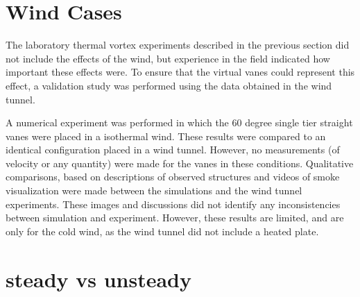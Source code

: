 \section{Wind Cases}

The laboratory thermal vortex experiments described in the previous
section did not include the effects of the wind, but experience in
the field indicated how important these effects were. To ensure that the
virtual vanes could represent this effect, a validation study 
was performed using the data obtained in the wind tunnel.

A numerical experiment was performed in which the 60 degree single tier
straight vanes were placed in a isothermal wind.  These results were
compared to an identical configuration placed in a wind tunnel.
However, no measurements (of velocity or any quantity) were made
for the vanes in these conditions. Qualitative comparisons, based on
descriptions of observed structures and videos of smoke visualization
were made between the simulations and the wind tunnel experiments. These
images and discussions did not 
identify any inconsistencies between simulation and experiment.
However, these results are limited, and are only for the cold wind, as
the wind tunnel did not include a heated plate.  


\section{steady vs unsteady}




